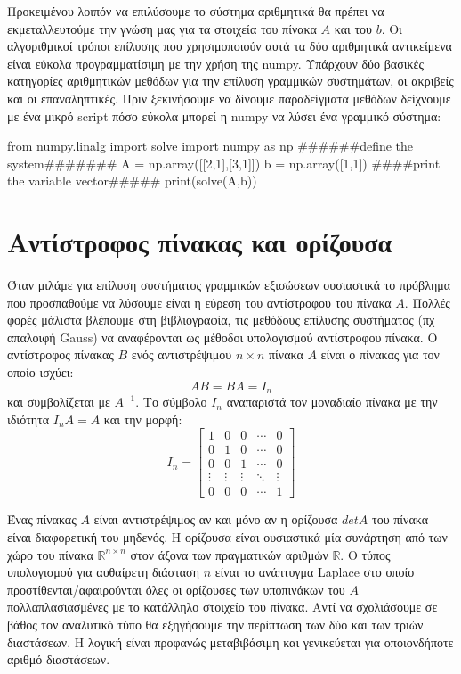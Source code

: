 Προκειμένου λοιπόν να επιλύσουμε το σύστημα αριθμητικά θα πρέπει να εκμεταλλευτούμε την γνώση μας για τα στοιχεία του πίνακα $A$ και του $b$. Οι αλγοριθμικοί τρόποι επίλυσης που χρησιμοποιούν αυτά τα δύο αριθμητικά αντικείμενα είναι εύκολα προγραμματίσιμη με την χρήση της {\en numpy}. Υπάρχουν δύο βασικές κατηγορίες αριθμητικών μεθόδων για την επίλυση γραμμικών συστημάτων, οι ακριβείς και οι επαναληπτικές. Πριν ξεκινήσουμε να δίνουμε παραδείγματα μεθόδων δείχνουμε με ένα μικρό {\en script} πόσο εύκολα μπορεί η {\en numpy} να λύσει ένα γραμμικό σύστημα:
\en
\begin{python}
from numpy.linalg import solve
import numpy as np
######define the system#######
A = np.array([[2,1],[3,1]])
b = np.array([1,1])
####print the variable vector#####
print(solve(A,b))
\end{python}
\vspace*{-0.7cm}
\begin{codeout}
[0. 1.]
\end{codeout}
\gr
\section{Αντίστροφος πίνακας και ορίζουσα}
Όταν μιλάμε για επίλυση συστήματος γραμμικών εξισώσεων ουσιαστικά το πρόβλημα που προσπαθούμε να λύσουμε είναι η εύρεση του αντίστροφου του πίνακα $Α$. Πολλές φορές μάλιστα βλέπουμε στη βιβλιογραφία, τις μεθόδους επίλυσης συστήματος (πχ απαλοιφή {\en Gauss}) να αναφέρονται ως μέθοδοι υπολογισμού αντίστροφου πίνακα.
Ο αντίστροφος πίνακας $Β$ ενός αντιστρέψιμου $n \times n$ πίνακα $A$ είναι ο πίνακας για τον οποίο ισχύει:
\begin{equation}
AB=BA=I_n
\end{equation}
και συμβολίζεται με $A^{-1}$. Το σύμβολο $I_n$ αναπαριστά τον μοναδιαίο πίνακα με την ιδιότητα $I_nA=A$ και την μορφή:
\begin{equation}
I_n=\left[\begin{array}{ccccc}
1 & 0 & 0 & \cdots & 0 \\
0 & 1 & 0 & \cdots & 0 \\
0 & 0 & 1 & \cdots & 0 \\
\vdots & \vdots & \vdots & \ddots & \vdots \\
0 & 0 & 0 & \cdots & 1
\end{array}\right]
\end{equation}

Ένας πίνακας $Α$ είναι αντιστρέψιμος αν και μόνο αν η ορίζουσα $detA$ του πίνακα είναι διαφορετική του μηδενός. Η ορίζουσα είναι ουσιαστικά μία συνάρτηση από των χώρο του πίνακα $\mathbb{R}^{n \times n}$ στον άξονα των πραγματικών αριθμών $\mathbb{R}$. Ο τύπος υπολογισμού για αυθαίρετη διάσταση $n$ είναι το ανάπτυγμα {\en Laplace} στο οποίο προστίθενται/αφαιρούνται όλες οι ορίζουσες των υποπινάκων του $A$ πολλαπλασιασμένες με το κατάλληλο στοιχείο του πίνακα. Αντί να σχολιάσουμε σε βάθος τον αναλυτικό τύπο θα εξηγήσουμε την περίπτωση των δύο και των τριών διαστάσεων. Η λογική είναι προφανώς μεταβιβάσιμη και γενικεύεται για οποιονδήποτε αριθμό διαστάσεων. 

